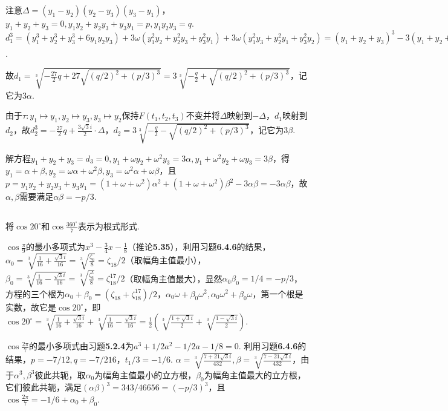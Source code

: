 注意$\Delta=(y_1-y_2)(y_2-y_3)(y_3-y_1)$，$y_1+y_2+y_3=0, y_1y_2+y_2y_3+y_3y_1=p, y_1y_2y_3=q$.
$d_1^3=(y_1^3+y_2^3+y_3^3+6y_1y_2y_3)+3\omega(y_1^2y_2+y_2^2y_3+y_3^2y_1)+3\omega(y_1^2y_3+y_2^2y_1+y_3^2y_2)
=(y_1+y_2+y_3)^3-3(y_1+y_2+y_3)(y_1y_2+y_2y_3+y_3y_1)-9y_1y_2y_3
+3/2\cdot\omega((y_1+y_2+y_3)(y_1y_2+y_2y_3+y_3y_1)-\Delta+3y_1y_2y_3)
+3/2\cdot\omega^2((y_1+y_2+y_3)(y_1y_2+y_2y_3+y_3y_1)+\Delta+3y_1y_2y_3)
=-9q-\frac{3\omega}{2}\cdot\Delta+\frac{9\omega q}{2}+\frac{3\omega^2}{2}\cdot\Delta+\frac{9\omega^2 q}{2}
=-\frac{27}{2}q-\frac{3\sqrt{3}i}{2}\cdot\Delta
=-\frac{27}{2}q+27\sqrt{(q/2)^2+(p/3)^3}$.

故$d_1=\sqrt[3]{-\frac{27}{2}q+27\sqrt{(q/2)^2+(p/3)^3}}
=3\sqrt[3]{-\frac{q}{2}+\sqrt{(q/2)^2+(p/3)^3}}$，记它为$3\alpha$.

由于$\tau: y_1\mapsto y_1, y_2\mapsto y_3, y_3\mapsto y_2$保持$F(t_1,t_2,t_3)$不变并将$\Delta$映射到$-\Delta$，$d_1$映射到$d_2$，故$d_2^3=-\frac{27}{2}q+\frac{3\sqrt{3}i}{2}\cdot\Delta$，$d_2=3\sqrt[3]{-\frac{q}{2}-\sqrt{(q/2)^2+(p/3)^3}}$，记它为$3\beta$.

解方程$y_1+y_2+y_3=d_3=0, y_1+\omega y_2+\omega^2 y_3=3\alpha, y_1+\omega^2 y_2+\omega y_3=3\beta$，得$y_1=\alpha+\beta, y_2=\omega\alpha+\omega^2\beta, y_3=\omega^2\alpha+\omega\beta$，且$p=y_1y_2+y_2y_3+y_3y_1=(1+\omega+\omega^2)\alpha^2+(1+\omega+\omega^2)\beta^2-3\alpha\beta=-3\alpha\beta$，故$\alpha,\beta$需要满足$\alpha\beta=-p/3$.

\subsection{}
将$\cos 20^{\circ}$和$\cos\frac{360^{\circ}}{7}$表示为根式形式.

\jie $\cos \frac{\pi}{9}$的最小多项式为$x^3-\frac{3}{4}x-\frac{1}{8}$（{\heiti 推论}\textbf{5.35}），利用{\heiti 习题}\textbf{6.4.6}的结果，$\alpha_0=\sqrt[3]{\frac{1}{16}+\frac{\sqrt{3}i}{16}}=\sqrt[3]{\frac{\zeta_6}{8}}=\zeta_{18}/2$（取幅角主值最小），$\beta_0=\sqrt[3]{\frac{1}{16}-\frac{\sqrt{3}i}{16}}=\sqrt[3]{\frac{\zeta_6^5}{8}}=\zeta_{18}^{17}/2$（取幅角主值最大），显然$\alpha_0\beta_0=1/4=-p/3$，方程的三个根为$\alpha_0+\beta_0=(\zeta_{18}+\zeta_{18}^{17})/2$，$\alpha_0\omega+\beta_0\omega^2, \alpha_0\omega^2+\beta_0\omega$，第一个根是实数，故它是$\cos 20^{\circ}$，即$\cos 20^{\circ}=\sqrt[3]{\frac{1}{16}+\frac{\sqrt{3}i}{16}}+\sqrt[3]{\frac{1}{16}-\frac{\sqrt{3}i}{16}}=\frac{1}{2}(\sqrt[3]{\frac{1+\sqrt{3}i}{2}}+\sqrt[3]{\frac{1-\sqrt{3}i}{2}})$.

$\cos \frac{2\pi}{7}$的最小多项式由{\heiti 习题}\textbf{5.2.4}为$a^3+1/2a^2-1/2a-1/8=0$. 利用{\heiti 习题}\textbf{6.4.6}的结果，$p=-7/12, q=-7/216$，$t_1/3=-1/6$. $\alpha=\sqrt[3]{\frac{7+21\sqrt{3}i}{432}},\beta=\sqrt[3]{\frac{7-21\sqrt{3}i}{432}}$，由于$\alpha^3,\beta^3$彼此共轭，取$\alpha_0$为幅角主值最小的立方根，$\beta_0$为幅角主值最大的立方根，它们彼此共轭，满足$(\alpha\beta)^3=343/46656=(-p/3)^3$，且$\cos \frac{2\pi}{7}=-1/6+\alpha_0+\beta_0$.

